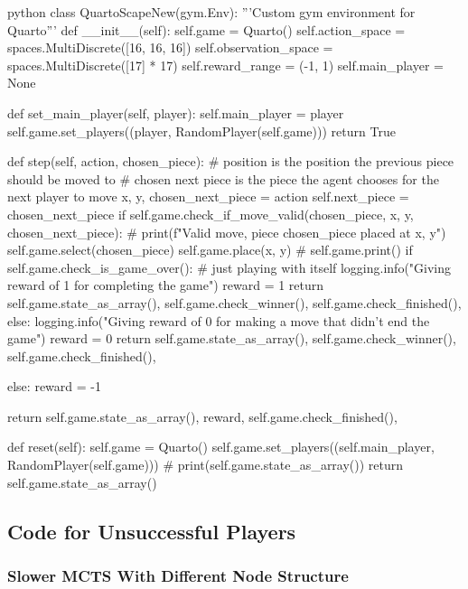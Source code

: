 \begin{mintedbox}{python}
class QuartoScapeNew(gym.Env):
'''Custom gym environment for Quarto'''
    def __init__(self):
        self.game = Quarto()
        self.action_space = spaces.MultiDiscrete([16, 16, 16])
        self.observation_space = spaces.MultiDiscrete([17] * 17)
        self.reward_range = (-1, 1)
        self.main_player = None

    def set_main_player(self, player):
        self.main_player = player
        self.game.set_players((player, RandomPlayer(self.game)))
        return True

    def step(self, action, chosen_piece):
        # position is the position the previous piece should be moved to
        # chosen next piece is the piece the agent chooses for the next player to move
        x, y, chosen_next_piece = action
        self.next_piece = chosen_next_piece
        if self.game.check_if_move_valid(chosen_piece, x, y, chosen_next_piece):
            # print(f"Valid move, piece {chosen_piece} placed at {x}, {y}")
            self.game.select(chosen_piece)
            self.game.place(x, y)
            # self.game.print()
            if self.game.check_is_game_over():
                # just playing with itself
                logging.info("Giving reward of 1 for completing the game")
                reward = 1
                return self.game.state_as_array(), self.game.check_winner(), self.game.check_finished(), {}
            else:
                logging.info("Giving reward of 0 for making a move that didn't end the game")
                reward = 0
                return self.game.state_as_array(), self.game.check_winner(), self.game.check_finished(), {}

        else:
            reward = -1

        return self.game.state_as_array(), reward, self.game.check_finished(), {}

    def reset(self):
        self.game = Quarto()
        self.game.set_players((self.main_player, RandomPlayer(self.game)))
        # print(self.game.state_as_array())
        return self.game.state_as_array()
\end{mintedbox}

\subsection{Code for Unsuccessful Players}


\subsubsection{Slower MCTS With Different Node Structure}

